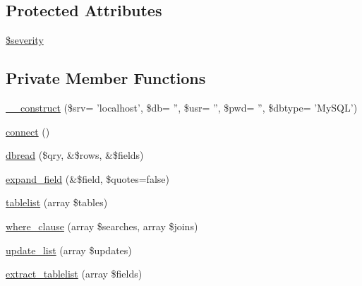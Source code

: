 \subsection*{Protected Attributes}
\begin{DoxyCompactItemize}
\item 
\hyperlink{class__OWL_ad26b40a9dbbacb33e299b17826f8327c}{\$severity}
\end{DoxyCompactItemize}
\subsection*{Private Member Functions}
\begin{DoxyCompactItemize}
\item 
\hyperlink{classDbHandler_ae54e9d4643f41a9296167086f6a769fc}{\_\-\_\-construct} (\$srv= 'localhost', \$db= '', \$usr= '', \$pwd= '', \$dbtype= 'MySQL')
\item 
\hyperlink{classDbHandler_a9cf52ba614981a0082063d57290d3b7c}{connect} ()
\item 
\hyperlink{classDbHandler_a130e49aa639fecb46ce6719ddcb0d72f}{dbread} (\$qry, \&\$rows, \&\$fields)
\item 
\hyperlink{classDbHandler_a7896419cf143412ad74ca8fccb11fb6e}{expand\_\-field} (\&\$field, \$quotes=false)
\item 
\hyperlink{classDbHandler_a0ea7d40a222cf6f1bf77b42e8eba03e4}{tablelist} (array \$tables)
\item 
\hyperlink{classDbHandler_a5075bce990f4dab6b588275f38d301c9}{where\_\-clause} (array \$searches, array \$joins)
\item 
\hyperlink{classDbHandler_a18d001f947569eaa09c2e74dfb225e15}{update\_\-list} (array \$updates)
\item 
\hyperlink{classDbHandler_a11636da2e77be029e036c7f68e0e58b4}{extract\_\-tablelist} (array \$fields)
\end{DoxyCompactItemize}
